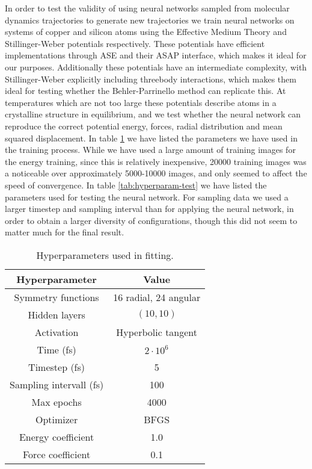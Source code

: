 In order to test the validity of using neural networks sampled
from molecular dynamics trajectories to generate new trajectories
we train neural networks on systems of copper and silicon atoms
using the Effective Medium Theory and Stillinger-Weber potentials
respectively. These potentials have efficient implementations
through ASE and their ASAP interface, which makes
it ideal for our purposes. Additionally these potentials
have an intermediate complexity, with Stillinger-Weber explicitly
including threebody interactions, which makes them ideal
for testing whether the Behler-Parrinello method can replicate this.
At temperatures which are not too large these potentials describe
atoms in a crystalline structure in equilibrium,
and we test whether the neural network can reproduce the correct potential
energy, forces, radial distribution and mean squared displacement.
In table \ref{tab:hyperparam} we have listed the parameters we have
used in the training process. While we have used a large amount
of training images for the energy training, since this is relatively
inexpensive, 20000 training images was a noticeable over approximately
5000-10000 images, and only seemed to affect the speed of convergence.
In table \ref{tab:hyperparam-test} we have listed the parameters
used for testing the neural network. For sampling data we used a larger
timestep and sampling interval
than for applying the neural network, in order to obtain
a larger diversity of configurations, though this did not seem to
matter much for the final result.

\begin{table}[H]
\centering
\begin{tabular}{|c c|}
\hline
Hyperparameter & Value \\
\hline \hline
Symmetry functions & 16 radial, 24 angular \\
    Hidden layers & $(10, 10)$ \\
Activation & Hyperbolic tangent \\
    Time (fs) & $2 \cdot 10^6$ \\
    Timestep (fs) & 5 \\
    Sampling intervall (fs) & 100 \\
Max epochs & 4000 \\
Optimizer & BFGS \\
Energy coefficient & 1.0 \\
Force coefficient & 0.1 \\
\hline
\end{tabular}
\caption{Hyperparameters used in fitting.}
\label{tab:hyperparam}
\end{table}

